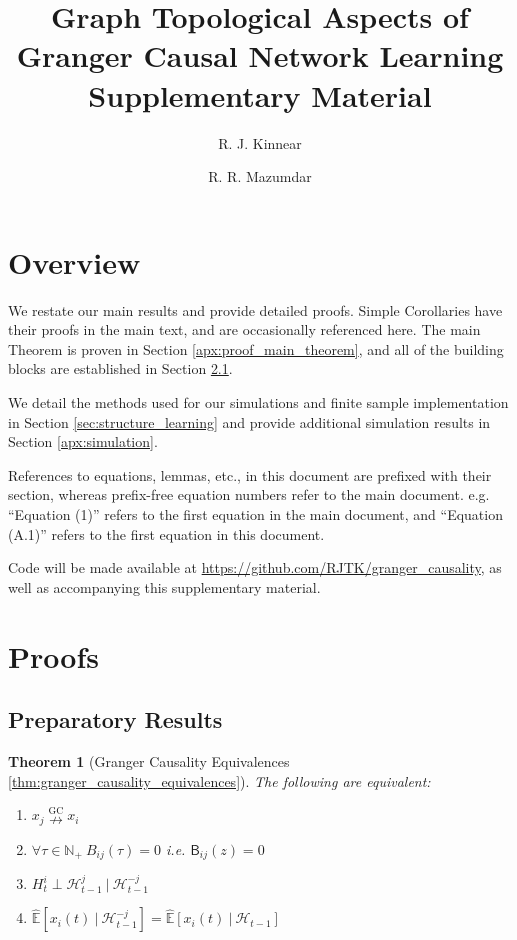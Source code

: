 \documentclass{statsoc}
\title{Graph Topological Aspects of Granger Causal Network Learning\\
  \large Supplementary Material}
\author[Author 1 {\it et al.}]{R. J. Kinnear}
\author{R. R. Mazumdar}
\def\ngc{\overset{\text{GC}}{\nrightarrow}}  %
\def\B{\mathsf{B}}  %
\def\H{\mathcal{H}}  %
\newcommand{\linE}[2]{\hat{\E}[#1\ |\ #2]}  %
\newtheorem{theorem}{Theorem}
\def\H{\mathcal{H}}  %
\def\E{\mathbb{E}}  %
\def\N{\mathbb{N}}  %
\begin{document}
\appendix

\section{Overview}
We restate our main results and provide detailed proofs.  Simple
Corollaries have their proofs in the main text, and are occasionally
referenced here.  The main Theorem is proven in Section
\ref{apx:proof_main_theorem}, and all of the building blocks are
established in Section \ref{apx:ancillary_results}.

We detail the methods used for our simulations and finite sample
implementation in Section \ref{sec:structure_learning} and provide
additional simulation results in Section \ref{apx:simulation}.

References to equations, lemmas, etc., in this document are prefixed
with their section, whereas prefix-free equation numbers refer to the
main document.  e.g. ``Equation (1)'' refers to the first equation in
the main document, and ``Equation (A.1)'' refers to the first equation
in this document.

Code will be made available at
\url{https://github.com/RJTK/granger_causality}, as well as
accompanying this supplementary material.

\section{Proofs}
\subsection{Preparatory Results}
\label{apx:ancillary_results}
\begin{theorem}[Granger Causality Equivalences \ref{thm:granger_causality_equivalences}]
  The following are equivalent:

  \begin{enumerate}
  \item{$x_j \ngc x_i$}
  \item{$\forall \tau \in \N_+\ B_{ij}(\tau) = 0$ i.e. $\B_{ij}(z) = 0$}
  \item{$H_t^{i} \perp \H_{t - 1}^{j}\ |\ \H_{t - 1}^{-j}$}
  \item{$\linE{x_i(t)}{\H_{t - 1}^{-j}} = \linE{x_i(t)}{\H_{t - 1}}$}
  \end{enumerate}
\end{theorem}
\end{document}
